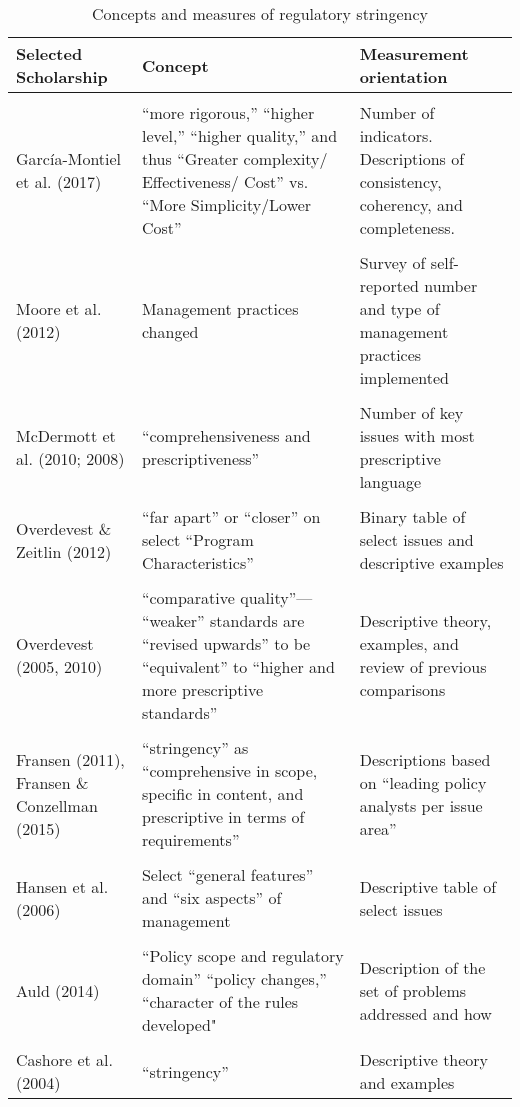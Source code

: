 \begin{table}
\caption{Concepts and measures of regulatory stringency}
\label{review}
\footnotesize

\begin{tabular}{p{3.5cm}p{8cm}p{5cm}}
Selected Scholarship & Concept &	Measurement orientation \\
\hline\\
García-Montiel et al. (2017)&
“more rigorous,” “higher level,” “higher quality,” and thus “Greater complexity/ Effectiveness/ Cost” vs. “More Simplicity/Lower Cost”&
Number of indicators. Descriptions of consistency, coherency, and completeness.\\
\hline\\
Moore et al. (2012)&
Management practices changed &	
Survey of self-reported number and type of management practices implemented\\
\hline\\
McDermott et al. (2010; 2008)&
“comprehensiveness and prescriptiveness”&
Number of key issues with most prescriptive language\\
\hline\\
Overdevest \& Zeitlin (2012)&
“far apart” or “closer” on select “Program Characteristics”&
Binary table of select issues and descriptive examples\\
\hline\\
Overdevest (2005, 2010)&
“comparative quality”— “weaker” standards are “revised upwards” to be “equivalent” to “higher and more prescriptive standards”&
Descriptive theory, examples, and review of previous comparisons\\
\hline\\
Fransen (2011), Fransen \& Conzellman (2015)&
“stringency” as “comprehensive in scope, specific in content, and prescriptive in terms of requirements”&
Descriptions based on “leading policy analysts per issue area”\\
\hline\\
Hansen et al. (2006)&
Select “general features” and “six aspects” of management &
Descriptive table of select issues\\
\hline\\
Auld (2014)&	
“Policy scope and regulatory domain” “policy changes,” “character of the rules developed"&
Description of the set of problems addressed and how\\
\hline\\
Cashore et al. (2004)&	
“stringency”&
Descriptive theory and examples\\

\end{tabular}
\end{table}
